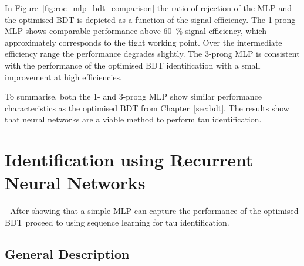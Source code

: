 In Figure~\ref{fig:roc_mlp_bdt_comparison} the ratio of rejection of the MLP and
the optimised BDT is depicted as a function of the signal efficiency. The
1-prong MLP shows comparable performance above \SI{60}{\percent} signal
efficiency, which approximately corresponds to the tight working point. Over the
intermediate efficiency range the performance degrades slightly. The 3-prong MLP
is consistent with the performance of the optimised BDT identification with a
small improvement at high efficiencies.

To summarise, both the 1- and 3-prong MLP show similar performance
characteristics as the optimised BDT from Chapter~\ref{sec:bdt}. The results
show that neural networks are a viable method to perform tau identification.


\section{Identification using Recurrent Neural Networks}
\label{sec:rnn_id}

- After showing that a simple MLP can capture the performance of the optimised BDT proceed to using sequence learning for tau identification.

\subsection{General Description}
\label{sec:rnn_descr}

